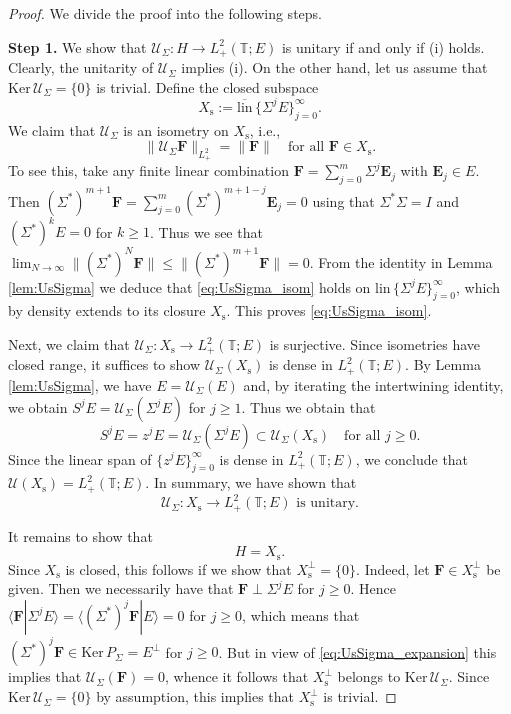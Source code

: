 \documentclass[10pt,reqno,a4paper]{amsart}
\theoremstyle{definition}
\theoremstyle{remark}
\theoremstyle{remark}
\numberwithin{equation}{section}
\newcommand{\T}{\mathbb{T}}
\newcommand{\ov}{\overline}
\renewcommand{\ker}{\mathrm{Ker}}
\newcommand{\be}{\begin{equation}}
\newcommand{\ee}{\end{equation}}
\newcommand{\Xs}{X_{\mathrm{s}}}
\newcommand{\Fb}{\mathbf{F}}
\newcommand{\Eb}{\mathbf{E}}
\newcommand{\id}{I}
\newcommand{\Us}{\mathscr{U}}
\begin{document}
\begin{proof} 
We divide the proof into the following steps.

\medskip
\textbf{Step 1.} We show that $\Us_\Sigma : H \to L^2_+(\T;E)$ is unitary if and only if (i) holds. Clearly, the unitarity of $\Us_\Sigma$ implies (i). On the other hand, let us assume that $\ker \, \Us_\Sigma = \{ 0 \}$ is trivial. Define the closed subspace
$$
\Xs := \ov{\mathrm{lin}} \, \{ \Sigma^j E \}_{j=0}^\infty.
$$
We claim that $\Us_\Sigma$ is an isometry on $\Xs$, i.e.,
\be \label{eq:UsSigma_isom}
\| \Us_\Sigma \Fb \|_{L^2_+} = \| \Fb \| \quad \mbox{for all $\Fb \in \Xs$}.
\ee
To see this, take any finite linear combination $\Fb = \sum_{j=0}^m \Sigma^j \Eb_j$ with $\Eb_j \in E$. Then $(\Sigma^*)^{m+1} \Fb = \sum_{j=0}^m (\Sigma^*)^{m+1-j} \Eb_j = 0$ using that $\Sigma^* \Sigma = \id$ and $(\Sigma^*)^k E = 0$ for $k \geq 1$. Thus we see that $\lim_{N \to \infty} \| (\Sigma^*)^N \Fb \| \leq \| (\Sigma^*)^{m+1} \Fb \| = 0$. From the identity in Lemma \ref{lem:UsSigma} we deduce that \eqref{eq:UsSigma_isom} holds on $\mathrm{lin} \, \{ \Sigma^j E \}_{j=0}^\infty$, which by density extends to its closure $\Xs$. This proves \eqref{eq:UsSigma_isom}.

Next, we claim that $\Us_\Sigma : \Xs \to L^2_+(\T;E)$ is surjective. Since isometries have closed range, it suffices to show $\Us_\Sigma(\Xs)$ is dense in $L^2_+(\T;E)$. By Lemma \ref{lem:UsSigma}, we have $E = \Us_\Sigma(E)$ and, by iterating the intertwining identity, we obtain $S^j E = \Us_\Sigma(\Sigma^j E)$ for $j \geq 1$. Thus we obtain that
$$
S^j E = z^j E = \Us_\Sigma(\Sigma^j E) \subset \Us_\Sigma(\Xs) \quad \mbox{for all $j \geq 0$}.
$$
Since the linear span of $\{ z^j E \}_{j=0}^\infty$ is dense in $L^2_+(\T;E)$, we conclude that $\Us(\Xs) = L^2_+(\T;E)$. In summary, we have shown that 
$$
\mbox{$\Us_{\Sigma} : \Xs \to L^2_+(\T;E)$ is unitary}.
$$

It remains to show that 
$$
H = \Xs.
$$ 
Since $\Xs$ is closed, this follows if we show that $\Xs^\perp = \{ 0 \}$. Indeed, let $\Fb \in \Xs^\perp$ be given. Then we necessarily have that $\Fb \perp \Sigma^j E$ for $j \geq 0$. Hence $\langle \Fb | \Sigma^j E \rangle = \langle (\Sigma^*)^j \Fb | E \rangle = 0$ for $j \geq 0$, which means that $(\Sigma^*)^j \Fb \in \ker \, P_\Sigma = E^\perp$ for $j \geq 0$. But in view of \eqref{eq:UsSigma_expansion} this implies that $\Us_\Sigma(\Fb)=0$, whence it follows that $\Xs^\perp$ belongs to $\ker \, \Us_\Sigma$. Since $\ker \, \Us_\Sigma = \{ 0 \}$ by assumption, this implies that $\Xs^\perp$ is trivial.


\end{proof}
\end{document}
